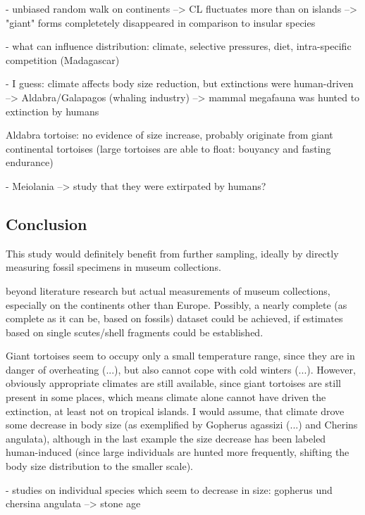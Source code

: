 - unbiased random walk on continents --> CL fluctuates more than on islands --> "giant" forms completetely disappeared in comparison to insular species

- what can influence distribution: climate, selective pressures, diet, intra-specific competition (Madagascar)

- I guess: climate affects body size reduction, but extinctions were human-driven
--> Aldabra/Galapagos (whaling industry)
--> mammal megafauna was hunted to extinction by humans





Aldabra tortoise: no evidence of size increase, probably originate from giant continental tortoises (large tortoises are able to float: bouyancy and fasting endurance)

- Meiolania --> study that they were extirpated by humans?

\subsection{Conclusion}


This study would definitely benefit from further sampling, ideally by directly measuring fossil specimens in museum collections.

beyond literature research but actual measurements of museum collections, especially on the continents other than Europe. Possibly, a nearly complete (as complete as it can be, based on fossils) dataset could be achieved, if estimates based on single scutes/shell fragments could be established.

Giant tortoises seem to occupy only a small temperature range, since they are in danger of overheating (...), but also cannot cope with cold winters (...). However, obviously appropriate climates are still available, since giant tortoises are still present in some places, which means climate alone cannot have driven the extinction, at least not on tropical islands.
I would assume, that climate drove some decrease in body size (as exemplified by Gopherus agassizi (...) and Cherins angulata), although in the last example the size decrease has been labeled human-induced (since large individuals are hunted more frequently, shifting the body size distribution to the smaller scale).


- studies on individual species which seem to decrease in size: gopherus und chersina angulata --> stone age

